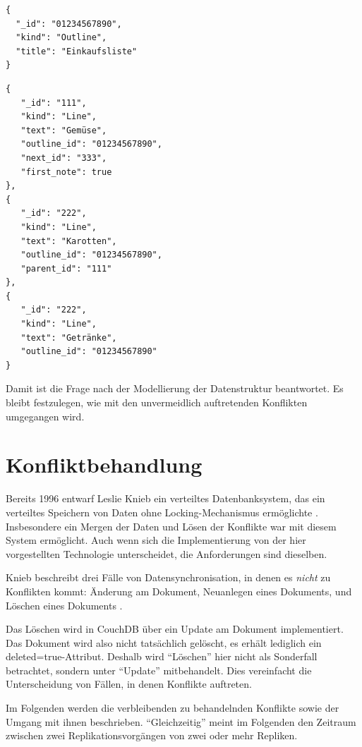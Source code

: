 \medskip
\begin{lstlisting}[caption=Gewählte Implementierung eines Outlines, label={lst:theoutline}]
{
  "_id": "01234567890",
  "kind": "Outline",
  "title": "Einkaufsliste"
}
\end{lstlisting}



\medskip
\begin{lstlisting}[caption=Gewählte Implementierung von drei Zeilen, label={lst:outlineLines}]
{
   "_id": "111",
   "kind": "Line",
   "text": "Gemüse",
   "outline_id": "01234567890",
   "next_id": "333",
   "first_note": true
},
{
   "_id": "222",
   "kind": "Line",
   "text": "Karotten",
   "outline_id": "01234567890",
   "parent_id": "111"
},
{
   "_id": "222",
   "kind": "Line",
   "text": "Getränke",
   "outline_id": "01234567890"
}
\end{lstlisting}


Damit ist die Frage nach der Modellierung der Datenstruktur beantwortet. Es bleibt festzulegen, wie mit den unvermeidlich auftretenden Konflikten umgegangen wird.


\section{Konfliktbehandlung}
\label{sec:konfliktbehandlung}

Bereits 1996 entwarf Leslie Knieb ein verteiltes Datenbanksystem, das ein verteiltes Speichern von Daten ohne Locking-Mechanismus ermöglichte . Insbesondere ein Mergen der Daten und Lösen der Konflikte war mit diesem System ermöglicht. Auch wenn sich die Implementierung von der hier vorgestellten Technologie unterscheidet, die Anforderungen sind dieselben.

Knieb beschreibt drei Fälle von Datensynchronisation, in denen es \textit{nicht} zu Konflikten kommt: Änderung am Dokument, Neuanlegen eines Dokuments, und Löschen eines Dokuments .

Das Löschen wird in CouchDB über ein Update am Dokument implementiert. Das Dokument wird also nicht tatsächlich gelöscht, es erhält lediglich ein {\selectfont deleted=true}-Attribut. Deshalb wird \enquote{Löschen} hier nicht als Sonderfall betrachtet, sondern unter \enquote{Update} mitbehandelt. Dies vereinfacht die Unterscheidung von Fällen, in denen Konflikte auftreten. 

Im Folgenden werden die verbleibenden zu behandelnden Konflikte sowie der Umgang mit ihnen beschrieben. \enquote{Gleichzeitig} meint im Folgenden den Zeitraum zwischen zwei Replikationsvorgängen von zwei oder mehr Repliken.

